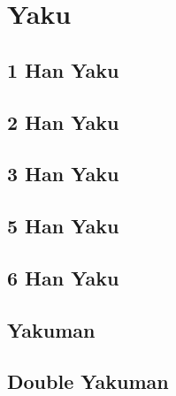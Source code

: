 \section{Yaku}\label{core:sec:yaku}

\subsection{1 Han Yaku}\label{core:ssec:1-han-yaku}

\subsection{2 Han Yaku}\label{core:ssec:2-han-yaku}

\subsection{3 Han Yaku}\label{core:ssec:3-han-yaku}

\subsection{5 Han Yaku}\label{core:ssec:5-han-yaku}

\subsection{6 Han Yaku}\label{core:ssec:6-han-yaku}

\subsection{Yakuman}\label{core:ssec:yakuman-yaku}

\subsection{Double Yakuman}\label{core:ssec:double-yakuman-yaku}
